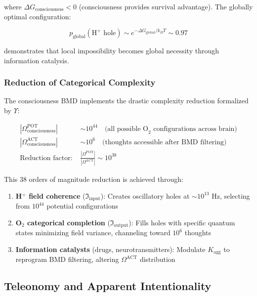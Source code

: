 where \(\Delta G_{\text{consciousness}} < 0\) (consciousness provides survival advantage). The globally optimal configuration:

\begin{equation}
p_{\text{global}}(\text{H}^+ \text{ hole}) \sim e^{-\Delta G_{\text{global}}/k_B T} \sim 0.97
\end{equation}

demonstrates that local impossibility becomes global necessity through information catalysis.

\subsubsection{Reduction of Categorical Complexity}

The consciousness BMD implements the drastic complexity reduction formalized by \(\Upsilon\):

\begin{align}
|\Omega^{\text{POT}}_{\text{consciousness}}| &\sim 10^{44} \quad \text{(all possible O}_2\text{ configurations across brain)} \\
|\Omega^{\text{ACT}}_{\text{consciousness}}| &\sim 10^{6} \quad \text{(thoughts accessible after BMD filtering)} \\
\text{Reduction factor: } & \frac{|\Omega^{\text{POT}}|}{|\Omega^{\text{ACT}}|} \sim 10^{38}
\end{align}

This 38 orders of magnitude reduction is achieved through:

\begin{enumerate}
\item \textbf{H\(^+\) field coherence} (\(\Im_{\text{input}}\)): Creates oscillatory holes at \(\sim 10^{13}\) Hz, selecting from \(10^{44}\) potential configurations

\item \textbf{O\(_2\) categorical completion} (\(\Im_{\text{output}}\)): Fills holes with specific quantum states minimizing field variance, channeling toward \(10^{6}\) thoughts

\item \textbf{Information catalysts} (drugs, neurotransmitters): Modulate \(K_{\text{agg}}\) to reprogram BMD filtering, altering \(\Omega^{\text{ACT}}\) distribution
\end{enumerate}

\subsection{Teleonomy and Apparent Intentionality}

